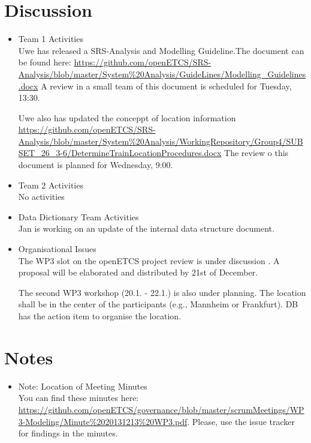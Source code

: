 \documentclass[a4paper, 11pt]{article}
\begin{document}
\section{Discussion}
\begin{itemize}
 
\item Team 1 Activities\\
Uwe has released a SRS-Analysis and Modelling Guideline.The document can be found here: 
\url{https://github.com/openETCS/SRS-Analysis/blob/master/System%20Analysis/GuideLines/Modelling_Guidelines.docx}
A review in a small team of this document is scheduled for Tuesday, 13:30.

Uwe also has updated the conceppt of location information \url{https://github.com/openETCS/SRS-Analysis/blob/master/System%20Analysis/WorkingRepository/Group4/SUBSET_26_3-6/DetermineTrainLocationProcedures.docx}
The review o this document is planned for Wednesday, 9:00.

\item Team 2 Activities\\
No activities\\

\item Data Dictionary Team Activities\\
Jan is working on an update of the internal data structure document.
 
\item Organisational Issues \\
The WP3 slot on the openETCS project review is under discussion . A proposal will be elaborated and distributed by 21st of December.

The second WP3 workshop (20.1. - 22.1.) is also under planning. The location shall be in the center of the participants (e.g., Mannheim or Frankfurt). DB has the action item to organise the location.

\end{itemize}

\section{Notes}
\begin{itemize}

\item Note: Location of Meeting Minutes\\
You can find these minutes here: \url{https://github.com/openETCS/governance/blob/master/scrumMeetings/WP3-Modeling/Minute%2020131213%20WP3.pdf}. Please, use the issue tracker for findings in the minutes.
\end{itemize}
\end{document}
